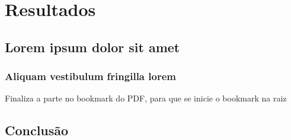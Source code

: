 \documentclass[12pt,openright,twoside,a4paper,english,french,spanish,brazil]{abntex2}
\begin{document}



\part{Resultados}

\chapter{Lorem ipsum dolor sit amet}

\section{Aliquam vestibulum fringilla lorem}

\lipsum[1]

\lipsum[2-3]

 Finaliza a parte no bookmark do PDF, para que se inicie o bookmark na raiz
% 

\chapter*[Conclusão]{Conclusão}

\lipsum[31-33]

\postextual
\cite{@}


%
%

\end{document}
